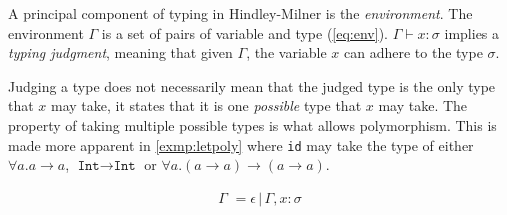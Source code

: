 \documentclass[11pt,oneside,a4paper]{report}
\begin{document}
A principal component of typing in Hindley-Milner is the \textit{environment}.
The environment $\Gamma$ is a set of pairs of variable and type (\autoref{eq:env}).
$\Gamma \vdash x: \sigma$ implies a \textit{typing judgment}, meaning that given $\Gamma$, the variable $x$ can adhere to the type $\sigma$.
\begin{remark}
    \label{remark:judgpoly}
    Judging a type does not necessarily mean that the judged type is the only type that $x$ may take, it states that it is one \textit{possible} type that $x$ may take.
    The property of taking multiple possible types is what allows polymorphism.
    This is made more apparent in \autoref{exmp:letpoly} where \texttt{id} may take the type of either $\forall a . a \rightarrow a$, $\texttt{Int} \rightarrow \texttt{Int}$ or $\forall a . (a \rightarrow a) \rightarrow (a \rightarrow a)$.
\end{remark}
\begin{align}
	\Gamma \,\, = \epsilon \,|\, \Gamma, x : \sigma
	\label{eq:env}
\end{align}
\end{document}
